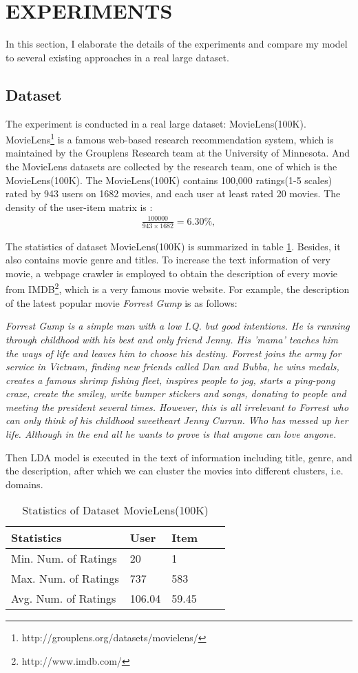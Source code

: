 \section{EXPERIMENTS}
In this section, I elaborate the details of the experiments and compare my model to several existing approaches in a real large dataset.
\subsection{Dataset}
The experiment is conducted in a real large dataset: MovieLens(100K). MovieLens\footnote{http://grouplens.org/datasets/movielens/} is a famous web-based research recommendation system, which is maintained by the Grouplens Research team at the University of Minnesota. And the MovieLens datasets are collected by the research team, one of which is the MovieLens(100K). The MovieLens(100K) contains 100,000 ratings(1-5 scales) rated by 943 users on 1682 movies, and each user at least rated 20 movies. The density of the user-item matrix is :
\begin{align*}
	\frac{100000}{943 \times 1682} = 6.30\%,
\end{align*}

The statistics of dataset MovieLens(100K) is summarized in table \ref{stats}. Besides, it also contains movie genre and titles. To increase the text information of very movie, a webpage crawler is employed to obtain the description of every movie from IMDB\footnote{http://www.imdb.com/}, which is a very famous movie website. For example, the description of the latest popular movie \textit{Forrest Gump}
is as follows:

\textit{Forrest Gump is a simple man with a low I.Q. but good intentions. He is running through childhood with his best and only friend Jenny. His 'mama' teaches him the ways of life and leaves him to choose his destiny. Forrest joins the army for service in Vietnam, finding new friends called Dan and Bubba, he wins medals, creates a famous shrimp fishing fleet, inspires people to jog, starts a ping-pong craze, create the smiley, write bumper stickers and songs, donating to people and meeting the president several times. However, this is all irrelevant to Forrest who can only think of his childhood sweetheart Jenny Curran. Who has messed up her life. Although in the end all he wants to prove is that anyone can love anyone.}

Then LDA model is executed in the text of information including title, genre, and the description, after which we can cluster the movies into different clusters, i.e. domains.
\begin{table}[]
	\centering
	\caption{Statistics of Dataset MovieLens(100K)}
	\label{stats}
	\begin{tabular}{|l|l|l|l|l|}
		\hline
		Statistics  & User  & Item   \\ \hline
		Min. Num. of Ratings  &20  &1   \\ \hline
		Max. Num. of Ratings  &737  &583  \\ \hline
		Avg. Num. of Ratings  &106.04  &59.45  \\ \hline
	\end{tabular}
\end{table}

